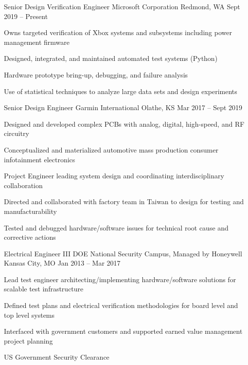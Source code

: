 \documentclass[]{awesome-cv}
\begin{document}
\vspace{-2mm}
\begin{cventries}
	\cventry
	{Senior Design Verification Engineer}
	{Microsoft Corporation}
	{Redmond, WA}
	{Sept 2019 – Present}
	{\begin{cvitems}
		\item {Owns targeted verification of Xbox systems and subsystems including power management firmware}
		\item {Designed, integrated, and maintained automated test systems (Python)}
		\item {Hardware prototype bring-up, debugging, and failure analysis}
		\item {Use of statistical techniques to analyze large data sets and design experiments}
	\end{cvitems}}
	\cventry
	{Senior Design Engineer}
	{Garmin International}
	{Olathe, KS}
	{Mar 2017 – Sept 2019}
	{\begin{cvitems}
		\item {Designed and developed complex PCBs with analog, digital, high-speed, and RF circuitry}
		\item {Conceptualized and materialized automotive mass production consumer infotainment electronics}
		\item {Project Engineer leading system design and coordinating interdisciplinary collaboration}
		\item {Directed and collaborated with factory team in Taiwan to design for testing and manufacturability}
		\item {Tested and debugged hardware/software issues for technical root cause and corrective actions}
		\end{cvitems}}
	\cventry
	{Electrical Engineer III}
	{DOE National Security Campus, Managed by Honeywell}
	{Kansas City, MO}
	{Jan 2013 – Mar 2017}
	{\begin{cvitems}
		\item {Lead test engineer architecting/implementing hardware/software solutions for scalable test infrastructure}
		\item {Defined test plans and electrical verification methodologies for board level and top level systems}
		\item {Interfaced with government customers and supported earned value management project planning}
		\item {US Government Security Clearance }

\end{cvitems}}
\end{cventries}
\end{document}
